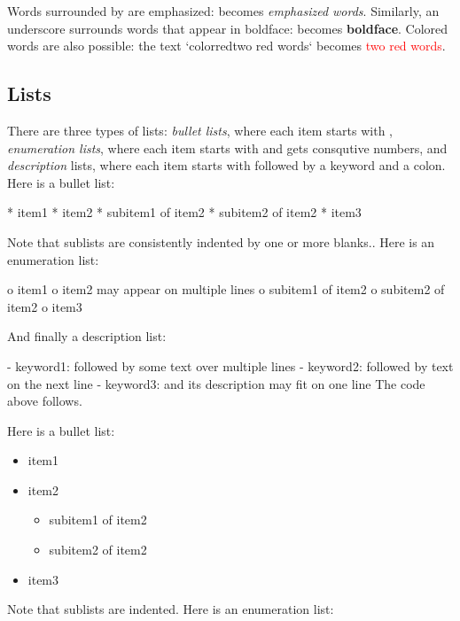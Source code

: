 \documentclass[%
oneside,                 %
final,                   %
10pt]{article}
\begin{document}
Words surrounded by \code{*} are emphasized:  becomes
\emph{emphasized words}. Similarly, an underscore surrounds words that
appear in boldface:  becomes \textbf{boldface}. Colored words
are also possible: the text
\bccq
`color{red}{two red words}`
\eccq
becomes \textcolor{red}{two red words}.

\subsection{Lists}

There are three types of lists: \emph{bullet lists}, where each item starts
with \code{*}, \emph{enumeration lists}, where each item starts with  and gets
consqutive numbers,
and \emph{description} lists, where each item starts with \code{-} followed
by a keyword and a colon.
\bccq
Here is a bullet list:

 * item1
 * item2
  * subitem1 of item2
  * subitem2 of item2
 * item3

Note that sublists are consistently indented by one or more blanks..
Here is an enumeration list:

 o item1
 o item2
   may appear on
   multiple lines
  o subitem1 of item2
  o subitem2 of item2
 o item3

And finally a description list:

 - keyword1: followed by
   some text
   over multiple
   lines
 - keyword2:
   followed by text on the next line
 - keyword3: and its description may fit on one line
\eccq
The code above follows.

Here is a bullet list:

\begin{itemize}
 \item item1

 \item item2
\begin{itemize}

  \item subitem1 of item2

  \item subitem2 of item2

\end{itemize}

\noindent
 \item item3
\end{itemize}

\noindent
Note that sublists are indented.
Here is an enumeration list:
\end{document}

